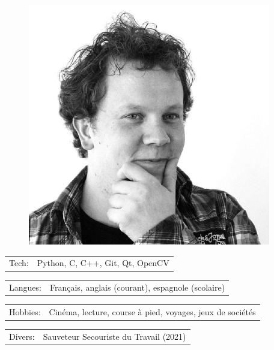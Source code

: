 \documentclass[10pt,A4]{article}
\newcommand{\tzlarrow}{(0,0) -- (0.2,0) -- (0.3,0.2) -- (0.2,0.4) -- (0,0.4) -- (0.1,0.2) -- cycle;}
\newcommand{\larrow}[1]
{\begin{tikzpicture}[scale=0.58]
	 \filldraw[fill=#1!100,draw=#1!100!black]  \tzlarrow
 \end{tikzpicture}
}
\newcommand{\metasection}[2]
{
\begin{tabular*}{1\textwidth}{p{2.4cm} p{11cm}}
\larrow{bgcol}	\normalsize{\textcolor{sectcol}{#1}}&#2\\[12pt]
\end{tabular*}
}
\begin{document}
\pagestyle{fancy}	


\vspace{-20.55pt}


\hspace{-0.25\linewidth}\colorbox{bgcol}{}



\begin{figure}[H]
\begin{flushright}
	\includegraphics[clip,width=0.2\linewidth]{resume/profil_picture.jpg}	%
\end{flushright}
\end{figure}


\vspace{-114pt}

\metasection{Tech:}{Python, C, C++, Git, Qt, OpenCV}
\metasection{Langues:}{Français, anglais (courant), espagnole (scolaire)}
\metasection{Hobbies:}{Cinéma, lecture, course à pied, voyages, jeux de sociétés}
\metasection{Divers:}{Sauveteur Secouriste du Travail (2021)}
\end{document}
